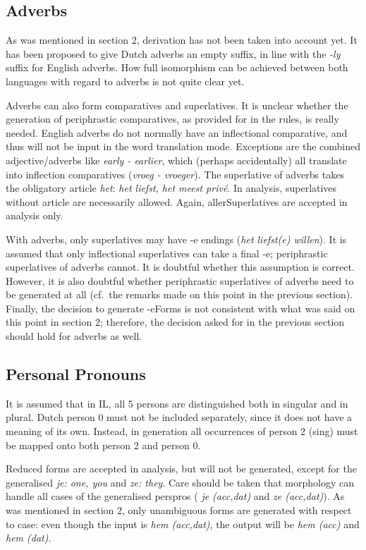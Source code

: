 \subsection{Adverbs}

As was mentioned in section 2, derivation has not been taken into account yet. 
It has been proposed to give Dutch adverbs an empty suffix, in line with the 
{\em -ly\/} 
suffix for English adverbs. How full isomorphism can be achieved between both 
languages with regard to adverbs is not quite clear yet.

Adverbs can also form comparatives and superlatives. It is unclear whether the 
generation of periphrastic comparatives, as provided for in the rules, is 
really needed. English adverbs do not normally have an inflectional 
comparative, and thus will not be input in the word translation mode. 
Exceptions are the combined adjective/adverbs like {\em early - earlier}, which
(perhaps accidentally) all translate into inflection comparatives ({\em vroeg - 
vroeger}). The superlative of adverbs takes the obligatory article {\em het\/}:
{\em het liefst, het meest priv\'{e}}. In analysis, superlatives without 
article are necessarily allowed. Again, allerSuperlatives are accepted in 
analysis only.

With adverbs, only superlatives may have -e endings ({\em het liefst(e) 
willen}). It is assumed that only inflectional superlatives can take a final -e;
periphrastic superlatives of adverbs cannot. It is doubtful whether this 
assumption is correct. However, it is also doubtful whether periphrastic 
superlatives of adverbs need to be generated at all (cf.\ the remarks made on 
this point in the previous section). Finally, the decision to generate -eForms 
is not consistent with what was said on this point in section 2; therefore, the 
decision asked for in the previous section should hold for adverbs as well.

\subsection{Personal Pronouns}
It is assumed that in IL, all 5 persons are distinguished both in singular and 
in plural. Dutch person 0 must not be included separately, since it does not 
have a meaning of its own. Instead, in generation all occurrences of person 2
(sing) must be mapped onto both person 2 and person 0.

Reduced forms are accepted in analysis, but will not be generated, except for 
the generalised {\em je: one, you} and {\em ze: they}. Care should be taken 
that morphology can handle all cases of the generalised perspros (
{\em je (acc,dat)\/} and {\em ze (acc,dat)\/}). As was 
mentioned in section 2, only unambiguous forms are generated with respect to 
case: even though the input is {\em hem (acc,dat)\/}, the output will be 
{\em hem (acc)\/} and {\em hem (dat)\/}.

